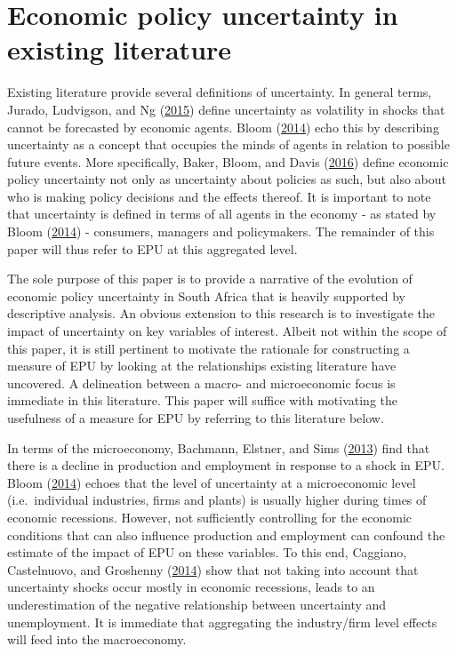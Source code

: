 \documentclass[11pt,preprint, authoryear]{elsarticle}
\numberwithin{equation}{section}
\numberwithin{figure}{section}
\numberwithin{table}{section}
\begin{document}
\section{\texorpdfstring{Economic policy uncertainty in existing
literature
\label{sec_litreview}}{Economic policy uncertainty in existing literature }}\label{economic-policy-uncertainty-in-existing-literature}

Existing literature provide several definitions of uncertainty. In
general terms, Jurado, Ludvigson, and Ng
(\protect\hyperlink{ref-Jurado2015}{2015}) define uncertainty as
volatility in shocks that cannot be forecasted by economic agents. Bloom
(\protect\hyperlink{ref-Bloom2014}{2014}) echo this by describing
uncertainty as a concept that occupies the minds of agents in relation
to possible future events. More specifically, Baker, Bloom, and Davis
(\protect\hyperlink{ref-Baker2016}{2016}) define economic policy
uncertainty not only as uncertainty about policies as such, but also
about who is making policy decisions and the effects thereof. It is
important to note that uncertainty is defined in terms of all agents in
the economy - as stated by Bloom
(\protect\hyperlink{ref-Bloom2014}{2014}) - consumers, managers and
policymakers. The remainder of this paper will thus refer to EPU at this
aggregated level.

The sole purpose of this paper is to provide a narrative of the
evolution of economic policy uncertainty in South Africa that is heavily
supported by descriptive analysis. An obvious extension to this research
is to investigate the impact of uncertainty on key variables of
interest. Albeit not within the scope of this paper, it is still
pertinent to motivate the rationale for constructing a measure of EPU by
looking at the relationships existing literature have uncovered. A
delineation between a macro- and microeconomic focus is immediate in
this literature. This paper will suffice with motivating the usefulness
of a measure for EPU by referring to this literature below.

In terms of the microeconomy, Bachmann, Elstner, and Sims
(\protect\hyperlink{ref-Bachmann2013}{2013}) find that there is a
decline in production and employment in response to a shock in EPU.
Bloom (\protect\hyperlink{ref-Bloom2014}{2014}) echoes that the level of
uncertainty at a microeconomic level (i.e.~individual industries, firms
and plants) is usually higher during times of economic recessions.
However, not sufficiently controlling for the economic conditions that
can also influence production and employment can confound the estimate
of the impact of EPU on these variables. To this end, Caggiano,
Castelnuovo, and Groshenny (\protect\hyperlink{ref-Caggiano2014}{2014})
show that not taking into account that uncertainty shocks occur mostly
in economic recessions, leads to an underestimation of the negative
relationship between uncertainty and unemployment. It is immediate that
aggregating the industry/firm level effects will feed into the
macroeconomy.
\end{document}
